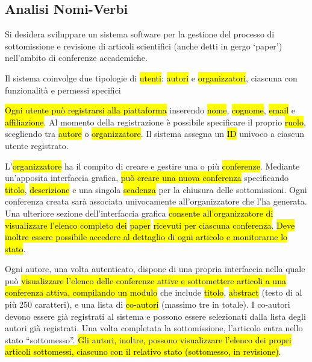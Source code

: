 \subsection{Analisi Nomi-Verbi}
\label{sec:analisi_nomi_verbi}
Si desidera sviluppare un sistema software per la gestione del
processo di sottomissione e revisione di articoli scientifici (anche
detti in gergo ‘paper’) nell’ambito di conferenze accademiche.
\bigskip

Il sistema coinvolge due tipologie di
\hl{utenti}:
\hl{autori} e
\hl{organizzatori}, ciascuna con funzionalità e
permessi specifici
\bigskip

\hl{Ogni utente può registrarsi alla
  piattaforma} inserendo \hl{nome},
\hl{cognome},
\hl{email} e
\hl{affiliazione}. Al momento della
registrazione è possibile specificare il proprio
\hl{ruolo}, scegliendo tra
\hl{autore} o
\hl{organizzatore}. Il sistema assegna un
\hl{ID} univoco a ciascun utente registrato.
\bigskip

L’\hl{organizzatore} ha il compito di creare e
gestire una o più \hl{conferenze}. Mediante
un’apposita interfaccia grafica, \hl{può creare
  una nuova conferenza} specificando
\hl{titolo},
\hl{descrizione} e una singola
\hl{scadenza} per la chiusura delle
sottomissioni. Ogni conferenza creata sarà associata univocamente
all’organizzatore che l’ha generata. Una ulteriore sezione
dell’interfaccia grafica \hl{consente
  all’organizzatore di visualizzare l’elenco completo dei}
\hl{paper} \hl{ricevuti per
  ciascuna conferenza}. \hl{Deve inoltre essere
  possibile accedere al dettaglio di ogni articolo e monitorarne lo
  stato}.  \bigskip

Ogni autore, una volta autenticato, dispone di una propria interfaccia
nella quale può \hl{visualizzare l’elenco delle
  conferenze attive e sottomettere articoli a una conferenza attiva,
  compilando un modulo} che include
\hl{titolo},
\hl{abstract} (testo di al più 250 caratteri),
e una lista di \hl{co-autori} (massimo tre in
totale). I co-autori devono essere già registrati al sistema e possono
essere selezionati dalla lista degli autori già registrati. Una volta
completata la sottomissione, l’articolo entra nello stato
“sottomesso”. \hl{Gli autori, inoltre, possono
  visualizzare l’elenco dei propri articoli sottomessi, ciascuno con
  il relativo stato (sottomesso, in revisione)}.  \bigskip

